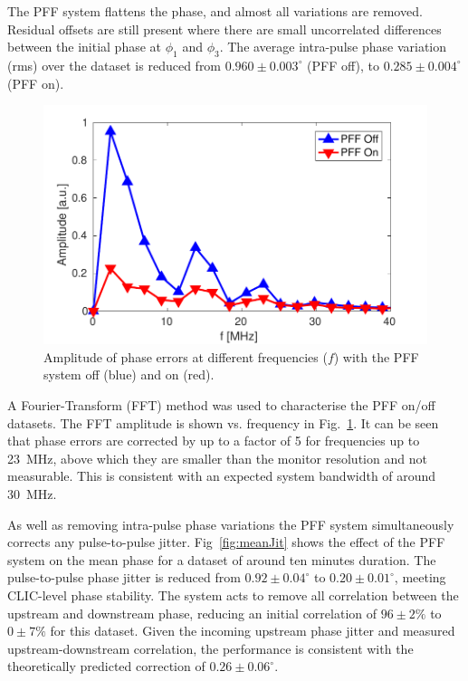 \documentclass[%
 reprint,
 superscriptaddress,
 amsmath,
 amssymb,
 prl,
]{revtex4-1}
\begin{document}
The PFF system flattens the phase, and almost all variations are removed. 
Residual offsets are still present where there are small uncorrelated 
differences between the initial phase at \(\phi_1\) and \(\phi_3\). 
The average intra-pulse phase variation (rms) over the dataset is reduced from 
\(0.960\pm0.003^\circ\) (PFF off), to \(0.285\pm0.004^\circ\) (PFF on).

\begin{figure}
	\includegraphics[width=\columnwidth]{figs/fft}
	\caption{\label{fig:fft}Amplitude of phase errors at different frequencies 
		(\(f\)) with the PFF system off (blue) and on (red).}
\end{figure}

A Fourier-Transform (FFT) method was used to characterise the PFF on/off 
datasets. The FFT amplitude is shown vs. frequency in 
Fig.~\ref{fig:fft}. It can be seen that phase errors are corrected by up to a 
factor of 5 for frequencies up to 23~MHz, above which 
they are smaller than the monitor resolution and not measurable. This 
is consistent with an expected system bandwidth of around 30~MHz.

As well as removing intra-pulse phase variations the PFF system simultaneously 
corrects any pulse-to-pulse jitter.
Fig~\ref{fig:meanJit} shows the effect of the PFF system on the mean 
phase for a dataset of around ten minutes duration.
The pulse-to-pulse phase jitter is reduced from  \(0.92\pm0.04^\circ\) to 
\(0.20\pm0.01^\circ\), meeting CLIC-level phase stability. 
The system acts to remove all correlation between the upstream and 
downstream phase, reducing an initial correlation of \(96\pm2\%\) to 
\(0\pm7\%\) for this dataset.
Given the incoming upstream phase jitter and 
measured upstream-downstream correlation, the performance is consistent with 
the theoretically predicted correction of \(0.26\pm0.06^\circ\).
\end{document}
